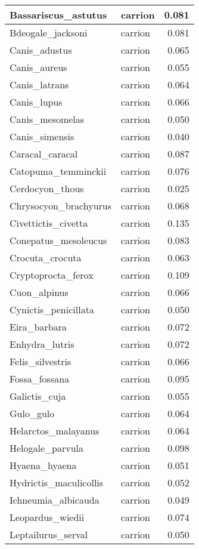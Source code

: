 \begin{table}
\begin{tabular}[t]{l|l|r}
\hline
Bassariscus\_astutus & carrion & 0.081\\
\hline
Bdeogale\_jacksoni & carrion & 0.081\\
\hline
Canis\_adustus & carrion & 0.065\\
\hline
Canis\_aureus & carrion & 0.055\\
\hline
Canis\_latrans & carrion & 0.064\\
\hline
Canis\_lupus & carrion & 0.066\\
\hline
Canis\_mesomelas & carrion & 0.050\\
\hline
Canis\_simensis & carrion & 0.040\\
\hline
Caracal\_caracal & carrion & 0.087\\
\hline
Catopuma\_temminckii & carrion & 0.076\\
\hline
Cerdocyon\_thous & carrion & 0.025\\
\hline
Chrysocyon\_brachyurus & carrion & 0.068\\
\hline
Civettictis\_civetta & carrion & 0.135\\
\hline
Conepatus\_mesoleucus & carrion & 0.083\\
\hline
Crocuta\_crocuta & carrion & 0.063\\
\hline
Cryptoprocta\_ferox & carrion & 0.109\\
\hline
Cuon\_alpinus & carrion & 0.066\\
\hline
Cynictis\_penicillata & carrion & 0.050\\
\hline
Eira\_barbara & carrion & 0.072\\
\hline
Enhydra\_lutris & carrion & 0.072\\
\hline
Felis\_silvestris & carrion & 0.066\\
\hline
Fossa\_fossana & carrion & 0.095\\
\hline
Galictis\_cuja & carrion & 0.055\\
\hline
Gulo\_gulo & carrion & 0.064\\
\hline
Helarctos\_malayanus & carrion & 0.064\\
\hline
Helogale\_parvula & carrion & 0.098\\
\hline
Hyaena\_hyaena & carrion & 0.051\\
\hline
Hydrictis\_maculicollis & carrion & 0.052\\
\hline
Ichneumia\_albicauda & carrion & 0.049\\
\hline
Leopardus\_wiedii & carrion & 0.074\\
\hline
Leptailurus\_serval & carrion & 0.050\\

\end{tabular}
\end{table}
